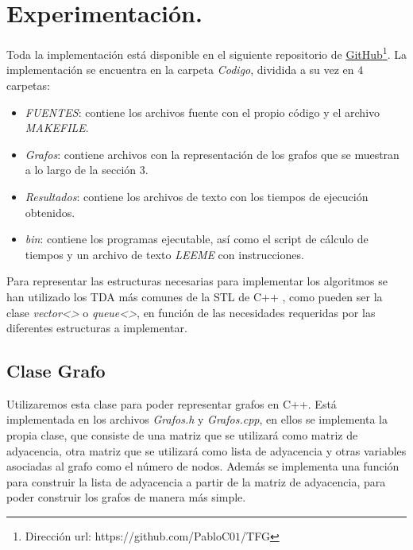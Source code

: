 
\chapter{Experimentación.}\label{ch:quinto-capitulo}

Toda la implementación está disponible en el siguiente repositorio de \href{https://github.com/PabloC01/TFG}{GitHub}\footnote{Dirección url: https://github.com/PabloC$01$/TFG}. La implementación se encuentra en la carpeta \textit{Codigo}, dividida a su vez en $4$ carpetas:

\begin{itemize}
	\item \textit{FUENTES}: contiene los archivos fuente con el propio código y el archivo \textit{MAKEFILE}.
	\item \textit{Grafos}: contiene archivos con la representación de los grafos que se muestran a lo largo de la sección 3.
	\item \textit{Resultados}: contiene los archivos de texto con los tiempos de ejecución obtenidos.
	\item \textit{bin}: contiene los programas ejecutable, así como el script de cálculo de tiempos y un archivo de texto \textit{LEEME} con instrucciones.
\end{itemize}

Para representar las estructuras necesarias para implementar los algoritmos se han utilizado los TDA más comunes de la STL de C++ \cite{alma991014010751904990}, como pueden ser la clase \textit{vector<>} o \textit{queue<>}, en función de las necesidades requeridas por las diferentes estructuras a implementar.

\section{Clase Grafo}

Utilizaremos esta clase para poder representar grafos en C++. Está implementada en los archivos \textit{Grafos.h} y \textit{Grafos.cpp}, en ellos se implementa la propia clase, que consiste de una matriz que se utilizará como matriz de adyacencia, otra matriz que se utilizará como lista de adyacencia y otras variables asociadas al grafo como el número de nodos. Además se implementa una función para construir la lista de adyacencia a partir de la matriz de adyacencia, para poder construir los grafos de manera más simple. \\

